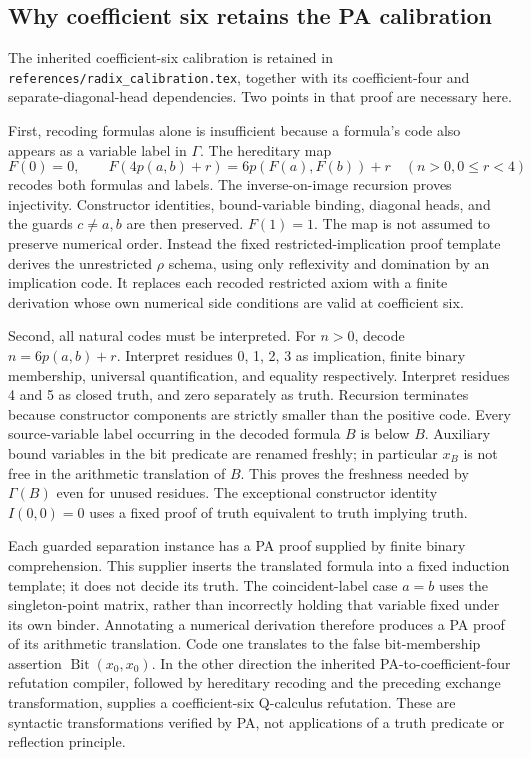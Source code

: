\subsection{Why coefficient six retains the PA calibration}

The inherited coefficient-six calibration is retained in
\texttt{references/radix\_calibration.tex}, together with its coefficient-four
and separate-diagonal-head dependencies. Two points in that proof are
necessary here.

First, recoding formulas alone is insufficient because a formula's code
also appears as a variable label in $\Gamma$. The hereditary map
\[
 F(0)=0,\qquad
 F(4p(a,b)+r)=6p(F(a),F(b))+r\quad(n>0, 0\le r<4)
\]
recodes both formulas and labels. The inverse-on-image recursion proves
injectivity. Constructor identities, bound-variable binding, diagonal
heads, and the guards $c\ne a,b$ are then preserved. $F(1)=1$.
The map is not assumed to preserve numerical order. Instead the fixed
restricted-implication proof template derives the unrestricted $\rho$
schema, using only reflexivity and domination by an implication code.
It replaces each recoded restricted axiom with a finite derivation whose
own numerical side conditions are valid at coefficient six.

Second, all natural codes must be interpreted. For $n>0$, decode
$n=6p(a,b)+r$. Interpret residues 0, 1, 2, 3 as implication, finite binary
membership, universal quantification, and equality respectively. Interpret
residues 4 and 5 as closed truth, and zero separately as truth. Recursion
terminates because constructor components are strictly smaller than the
positive code. Every source-variable label occurring in the decoded formula $B$ is below
$B$. Auxiliary bound variables in the bit predicate are renamed freshly;
in particular $x_B$ is not free in the arithmetic translation of $B$.
This proves the freshness needed by $\Gamma(B)$ even for unused residues.
The exceptional constructor identity $I(0,0)=0$ uses a fixed proof of
truth equivalent to truth implying truth.

Each guarded separation instance has a PA proof supplied by finite binary
comprehension. This supplier inserts the translated formula into a fixed
induction template; it does not decide its truth. The coincident-label
case $a=b$ uses the singleton-point matrix, rather than incorrectly
holding that variable fixed under its own binder. Annotating a numerical
derivation therefore produces a PA proof of its arithmetic translation.
Code one translates to the false bit-membership assertion
$\operatorname{Bit}(x_0,x_0)$. In the other direction the inherited
PA-to-coefficient-four refutation compiler, followed by hereditary recoding
and the preceding exchange transformation, supplies a coefficient-six
Q-calculus refutation. These are syntactic transformations verified by PA,
not applications of a truth predicate or reflection principle.

